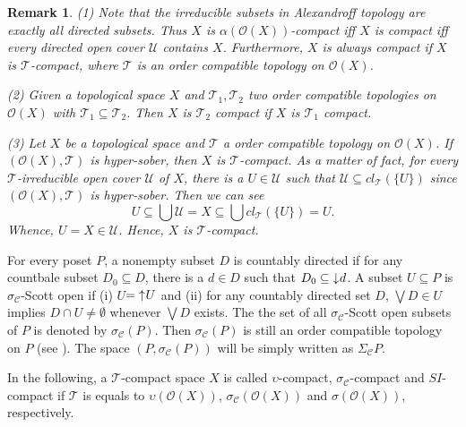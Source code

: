 \documentclass[preprint,12pt]{elsarticle}
\numberwithin{equation}{section}
\newtheorem{remark}[theorem]{Remark}
\newcommand{\dn}{\mathord{\downarrow}\hspace{0.05em}}
\newcommand{\up}{\mathord{\uparrow}\hspace{0.05em}}
\begin{document}
\begin{remark} {\rm (1) Note that the irreducible subsets in Alexandroff topology are exactly all directed subsets. Thus $X$ is $\alpha(\mathcal{O}(X))$-compact iff $X$ is compact iff every directed open cover $\mathcal{U}$ contains $X$. Furthermore, $X$ is always compact if $X$ is $\mathcal{T}$-compact, where $\mathcal{T}$ is an order compatible topology on $\mathcal{O}(X)$.

(2) Given a topological space $X$ and $\mathcal{T}_{1},\mathcal{T}_{2}$ two order compatible topologies on $\mathcal{O}(X)$ with $\mathcal{T}_{1}\subseteq\mathcal{T}_{2}$. Then $X$ is $\mathcal{T}_{2}$ compact if $X$ is $\mathcal{T}_{1}$ compact.

(3) Let $X$ be a topological space and $\mathcal{T}$ a order compatible topology on $\mathcal{O}(X)$. If $(\mathcal{O}(X),\mathcal{T})$ is hyper-sober, then $X$ is $\mathcal{T}$-compact. As a matter of fact, for every $\mathcal{T}$-irreducible open cover $\mathcal{U}$ of $X$, there is a $U\in\mathcal{U}$ such that $\mathcal{U}\subseteq cl_{\mathcal{T}}(\{U\})$ since $(\mathcal{O}(X),\mathcal{T})$ is hyper-sober. Then we can see $$U\subseteq\bigcup\mathcal{U}=X\subseteq\bigcup cl_{\mathcal{T}}(\{U\})=U.$$ Whence, $U=X\in\mathcal{U}$. Hence, $X$ is $\mathcal{T}$-compact.
}
\end{remark}


\quad For every poset $P$, a  nonempty subset $D$ is  countably directed if for any countbale subset $D_{0}\subseteq D$, there is a $d\in D$ such that $D_{0}\subseteq\dn d$. A subset $U\subseteq P$ is $\sigma_{\mathcal{C}}$-Scott open if (i) $U$$=\up U$ and (ii) for any countably directed set $D$, $\bigvee D\in U$ implies
$D\cap U\neq \emptyset$ whenever $\bigvee D$ exists. The the set of all $\sigma_{\mathcal{C}}$-Scott open subsets of $P$ is denoted by $\sigma_{\mathcal{C}}(P)$. Then $\sigma_{\mathcal{C}}(P)$ is still an order compatible topology on $P$ (see \cite{GGL23,KOY35,HQT116}). The space $(P, \sigma_{\mathcal{C}}(P))$ will be simply written as $\Sigma_{\mathcal{C}}P$.

\quad In the following, a $\mathcal{T}$-compact space $X$ is called $\upsilon$-compact, $\sigma_{\mathcal{C}}$-compact and $SI$-compact if  $\mathcal{T}$ is equals to $\upsilon(\mathcal{O}(X))$, $\sigma_{\mathcal{C}}(\mathcal{O}(X))$ and $\sigma(\mathcal{O}(X))$, respectively.
\end{document}
